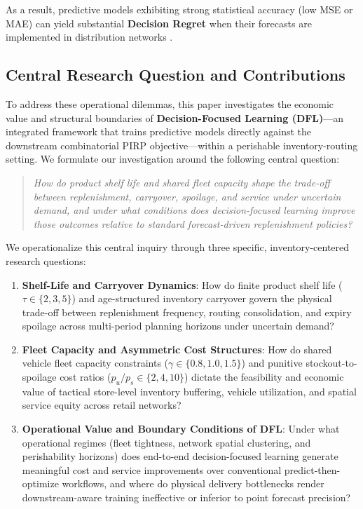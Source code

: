 \documentclass[11pt,a4paper]{article}
\theoremstyle{definition}
\theoremstyle{remark}
\begin{document}
As a result, predictive models exhibiting strong statistical accuracy (low MSE or MAE) can yield substantial \textbf{Decision Regret} when their forecasts are implemented in distribution networks \citep{bertsimas2020predictive,ban2019big}.

\subsection{Central Research Question and Contributions}
\label{subsec:rqs_contributions}

To address these operational dilemmas, this paper investigates the economic value and structural boundaries of \textbf{Decision-Focused Learning (DFL)}---an integrated framework that trains predictive models directly against the downstream combinatorial PIRP objective---within a perishable inventory-routing setting. We formulate our investigation around the following central question:
\begin{quote}
\textit{How do product shelf life and shared fleet capacity shape the trade-off between replenishment, carryover, spoilage, and service under uncertain demand, and under what conditions does decision-focused learning improve those outcomes relative to standard forecast-driven replenishment policies?}
\end{quote}

We operationalize this central inquiry through three specific, inventory-centered research questions:
\begin{enumerate}[label=\textbf{RQ\arabic*.}]
    \item \textbf{Shelf-Life and Carryover Dynamics}: How do finite product shelf life ($\tau \in \{2, 3, 5\}$) and age-structured inventory carryover govern the physical trade-off between replenishment frequency, routing consolidation, and expiry spoilage across multi-period planning horizons under uncertain demand?
    \item \textbf{Fleet Capacity and Asymmetric Cost Structures}: How do shared vehicle fleet capacity constraints ($\gamma \in \{0.8, 1.0, 1.5\}$) and punitive stockout-to-spoilage cost ratios ($p_u/p_s \in \{2, 4, 10\}$) dictate the feasibility and economic value of tactical store-level inventory buffering, vehicle utilization, and spatial service equity across retail networks?
    \item \textbf{Operational Value and Boundary Conditions of DFL}: Under what operational regimes (fleet tightness, network spatial clustering, and perishability horizons) does end-to-end decision-focused learning generate meaningful cost and service improvements over conventional predict-then-optimize workflows, and where do physical delivery bottlenecks render downstream-aware training ineffective or inferior to point forecast precision?
\end{enumerate}
\end{document}
